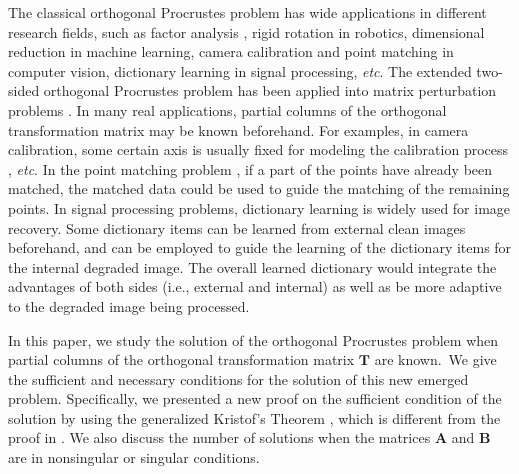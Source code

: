 \documentclass[titlepage,11pt,twoside]{article}
\begin{document}
The classical orthogonal Procrustes problem \cite{procrustesprogram} has wide applications in different research fields, such as factor analysis \cite{green1952orthogonal}, rigid rotation \cite{Berge2006} in robotics, dimensional reduction \cite{zou2006sparse} in machine learning, camera calibration \cite{zhang2000flexible} and point matching \cite{pointpatterns} in computer vision, dictionary learning \cite{aharon2006img} in signal processing, \emph{etc}. The extended two-sided orthogonal Procrustes problem has been applied into matrix perturbation problems \cite{schonemann1968two}. In many real applications, partial columns of the orthogonal transformation matrix may be known beforehand. For examples, in camera calibration, some certain axis is usually fixed for modeling the calibration process \cite{zhang2000flexible}, \emph{etc}. In the point matching problem \cite{pointpatterns}, if a part of the points have already been matched, the matched data could be used to guide the matching of the remaining points. In signal processing problems, dictionary learning \cite{aharon2006img} is widely used for image recovery. Some dictionary items can be learned from external clean images beforehand, and can be employed to guide the learning of the dictionary items for the internal degraded image. The overall learned dictionary would integrate the advantages of both sides (i.e., external and internal) as well as be more adaptive to the degraded image being processed.

In this paper, we study the solution of the orthogonal Procrustes problem when partial columns of the orthogonal transformation matrix $\mathbf{T}$ are known.\ We give the sufficient and necessary conditions for the solution of this new emerged problem. Specifically, we presented a new proof on the sufficient condition of the solution by using the generalized Kristof's Theorem \cite{TenBerge1983}, which is different from the proof in \cite{schonemann1966generalized}. We also discuss the number of solutions when the matrices $\mathbf{A}$ and $\mathbf{B}$ are in nonsingular or singular conditions.
\end{document}

